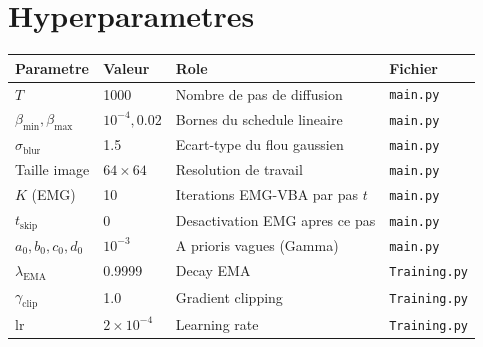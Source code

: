 \documentclass[12pt]{article}
\newcommand{\file}[1]{\texttt{\color{codeblue}#1}}
\begin{document}
\section{Hyperparametres}

\begin{center}
\begin{tabular}{llll}
\toprule
\textbf{Parametre} & \textbf{Valeur} & \textbf{Role} & \textbf{Fichier} \\
\midrule
$T$ & 1000 & Nombre de pas de diffusion & \file{main.py} \\
$\beta_{\min}, \beta_{\max}$ & $10^{-4}, 0.02$ & Bornes du schedule lineaire & \file{main.py} \\
$\sigma_{\text{blur}}$ & 1.5 & Ecart-type du flou gaussien & \file{main.py} \\
Taille image & $64 \times 64$ & Resolution de travail & \file{main.py} \\
$K$ (EMG) & 10 & Iterations EMG-VBA par pas $t$ & \file{main.py} \\
$t_{\text{skip}}$ & 0 & Desactivation EMG apres ce pas & \file{main.py} \\
$a_0, b_0, c_0, d_0$ & $10^{-3}$ & A prioris vagues (Gamma) & \file{main.py} \\
$\lambda_{\text{EMA}}$ & 0.9999 & Decay EMA & \file{Training.py} \\
$\gamma_{\text{clip}}$ & 1.0 & Gradient clipping & \file{Training.py} \\
lr & $2 \times 10^{-4}$ & Learning rate & \file{Training.py} \\
\bottomrule
\end{tabular}
\end{center}
\end{document}
